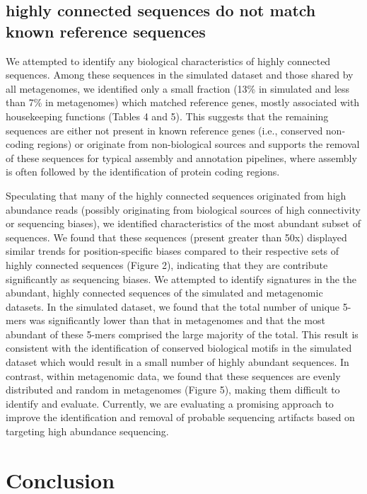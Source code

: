 \documentclass[10pt]{article}
\begin{document}
\subsection*{highly connected sequences do not match known reference sequences}

We attempted to identify any biological characteristics of highly
connected sequences.  Among these sequences in the simulated dataset
and those shared by all metagenomes, we identified only a small
fraction (13\% in simulated and less than 7\% in metagenomes) which
matched reference genes, mostly associated with housekeeping functions
(Tables 4 and 5).  This suggests that the remaining sequences are
either not present in known reference genes (i.e., conserved
non-coding regions) or originate from non-biological sources and
supports the removal of these sequences for typical assembly and
annotation pipelines, where assembly is often followed by the
identification of protein coding regions.

Speculating that many of the highly connected sequences originated
from high abundance reads (possibly originating from biological
sources of high connectivity or sequencing biases), we identified
characteristics of the most abundant subset of sequences.  We found
that these sequences (present greater than 50x) displayed similar
trends for position-specific biases compared to their respective sets
of highly connected sequences (Figure 2), indicating that they are
contribute significantly as sequencing biases.  We attempted to
identify signatures in the the abundant, highly connected sequences of
the simulated and metagenomic datasets.  In the simulated dataset, we
found that the total number of unique 5-mers was significantly lower
than that in metagenomes and that the most abundant of these 5-mers
comprised the large majority of the total.  This result is consistent
with the identification of conserved biological motifs in the
simulated dataset which would result in a small number of highly
abundant sequences.  In contrast, within metagenomic data, we found
that these sequences are evenly distributed and random in metagenomes
(Figure 5), making them difficult to identify and evaluate.
Currently, we are evaluating a promising approach to improve the
identification and removal of probable sequencing artifacts based on
targeting high abundance sequencing.

\section*{Conclusion}
\end{document}
